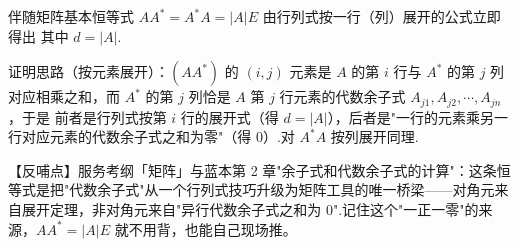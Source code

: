 \begin{fdeep}{伴随矩阵基本恒等式 $AA^{*}=A^{*}A=|A|E$}
由行列式按一行（列）展开的公式立即得出
其中 $d=|A|$.

证明思路（按元素展开）：$(AA^{*})$ 的 $(i,j)$ 元素是 $A$ 的第 $i$ 行与 $A^{*}$ 的第 $j$ 列对应相乘之和，而 $A^{*}$ 的第 $j$ 列恰是 $A$ 第 $j$ 行元素的代数余子式 $A_{j1},A_{j2},\cdots,A_{jn}$，于是
前者是行列式按第 $i$ 行的展开式（得 $d=|A|$），后者是"一行的元素乘另一行对应元素的代数余子式之和为零"（得 $0$）.对 $A^{*}A$ 按列展开同理.

【反哺点】服务考纲「矩阵」与蓝本第 2 章"余子式和代数余子式的计算"：这条恒等式是把"代数余子式"从一个行列式技巧升级为矩阵工具的唯一桥梁——对角元来自展开定理，非对角元来自"异行代数余子式之和为 0".记住这个"一正一零"的来源，$AA^{*}=|A|E$ 就不用背，也能自己现场推。
\end{fdeep}


